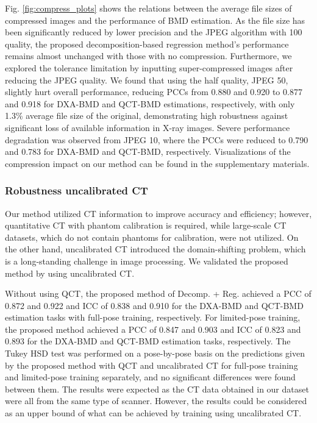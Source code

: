 \documentclass[times,twocolumn,final]{elsarticle}
\begin{document}
Fig. \ref{fig:compress_plots} shows the relations between the average file sizes of compressed images and the performance of BMD estimation.
As the file size has been significantly reduced by lower precision and the JPEG algorithm with 100 quality, the proposed decomposition-based regression method's performance remains almost unchanged with those with no compression.
Furthermore, we explored the tolerance limitation by inputting super-compressed images after reducing the JPEG quality.
We found that using the half quality, JPEG 50, slightly hurt overall performance, reducing PCCs from 0.880 and 0.920 to 0.877 and 0.918 for DXA-BMD and QCT-BMD estimations, respectively, with only 1.3\% average file size of the original, demonstrating high robustness against significant loss of available information in X-ray images.
Severe performance degradation was observed from JPEG 10, where the PCCs were reduced to 0.790 and 0.783 for DXA-BMD and QCT-BMD, respectively.
Visualizations of the compression impact on our method can be found in the supplementary materials.

\subsubsection{Robustness uncalibrated CT}
\label{sec:exp_ct}
Our method utilized CT information to improve accuracy and efficiency; however, quantitative CT with phantom calibration is required, while large-scale CT datasets, which do not contain phantoms for calibration, were not utilized.
On the other hand, uncalibrated CT introduced the domain-shifting problem, which is a long-standing challenge in image processing.
We validated the proposed method by using uncalibrated CT.

Without using QCT, the proposed method of Decomp. + Reg. achieved a PCC of 0.872 and 0.922 and ICC of 0.838 and 0.910 for the DXA-BMD and QCT-BMD estimation tasks with full-pose training, respectively.
For limited-pose training, the proposed method achieved a PCC of 0.847 and 0.903 and ICC of 0.823 and 0.893 for the DXA-BMD and QCT-BMD estimation tasks, respectively.
The Tukey HSD test was performed on a pose-by-pose basis on the predictions given by the proposed method with QCT and uncalibrated CT for full-pose training and limited-pose training separately, and no significant differences were found between them.
The results were expected as the CT data obtained in our dataset were all from the same type of scanner.
However, the results could be considered as an upper bound of what can be achieved by training using uncalibrated CT.
\end{document}

